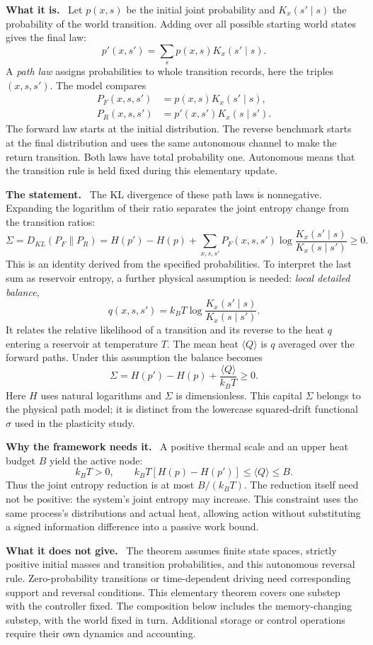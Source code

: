 \documentclass[11pt]{article}
\newcommand{\what}{\par\smallskip\noindent\textbf{What it is.}\ }
\newcommand{\why}{\par\smallskip\noindent\textbf{Why the framework needs it.}\ }
\newcommand{\statement}{\par\smallskip\noindent\textbf{The statement.}\ }
\newcommand{\scope}{\par\smallskip\noindent\textbf{What it does not give.}\ }
\begin{document}
\what
Let $p(x,s)$ be the initial joint probability and $K_x(s'\mid s)$ the
probability of the world transition. Adding over all possible starting world
states gives the final law:
\[
 p'(x,s')=\sum_s p(x,s)K_x(s'\mid s).
\]
A \emph{path law} assigns probabilities to whole transition records, here
the triples $(x,s,s')$. The model compares
\begin{align*}
 P_F(x,s,s')&=p(x,s)K_x(s'\mid s),\\
 P_R(x,s,s')&=p'(x,s')K_x(s\mid s').
\end{align*}
The forward law starts at the initial distribution. The reverse benchmark
starts at the final distribution and uses the same autonomous channel to
make the return transition. Both laws have total probability one. Autonomous
means that the transition rule is held fixed during this elementary update.

\statement
The KL divergence of these path laws is nonnegative. Expanding the logarithm
of their ratio separates the joint entropy change from the transition ratios:
\[
 \Sigma=D_{KL}(P_F\|P_R)
 =H(p')-H(p)+\sum_{x,s,s'}P_F(x,s,s')
       \log\frac{K_x(s'\mid s)}{K_x(s\mid s')}\ge0.
\]
This is an identity derived from the specified probabilities. To interpret
the last sum as reservoir entropy, a further physical assumption is needed:
\emph{local detailed balance},
\[
 q(x,s,s')=k_BT\log\frac{K_x(s'\mid s)}{K_x(s\mid s')}.
\]
It relates the relative likelihood of a transition and its reverse to the
heat $q$ entering a reservoir at temperature $T$. The mean heat
$\langle Q\rangle$ is $q$ averaged over the forward paths. Under this
assumption the balance becomes
\[
 \Sigma=H(p')-H(p)+\frac{\langle Q\rangle}{k_BT}\ge0.
\]
Here $H$ uses natural logarithms and $\Sigma$ is dimensionless. This capital
$\Sigma$ belongs to the physical path model; it is distinct from the
lowercase squared-drift functional $\sigma$ used in the plasticity study.

\why
A positive thermal scale and an upper heat budget $B$ yield the active node:
\[
 k_BT>0,\qquad
 k_BT[H(p)-H(p')]\le\langle Q\rangle\le B.
\]
Thus the joint entropy reduction is at most $B/(k_BT)$. The reduction itself
need not be positive: the system's joint entropy may increase. This constraint
uses the same process's distributions and actual heat, allowing action without
substituting a signed information difference into a passive work bound.

\scope
The theorem assumes finite state spaces, strictly positive initial masses and
transition probabilities, and this autonomous reversal rule. Zero-probability
transitions or time-dependent driving need corresponding support and reversal
conditions. This elementary theorem covers one substep with the controller
fixed. The composition below includes the memory-changing substep, with the
world fixed in turn. Additional storage or control operations require their
own dynamics and accounting.
\end{document}
